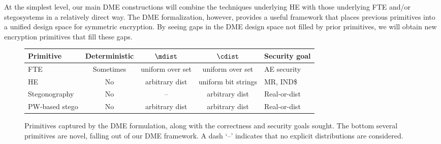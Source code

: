 At the simplest level, our main DME constructions will combine the techniques
underlying HE with those underlying FTE and/or stegosystems in a relatively
direct way.  The DME formalization, however, provides a useful framework that
places previous primitives into a unified design space for symmetric encryption.
By seeing gaps in the DME design space not filled by prior primitives, we will
obtain new encryption primitives that fill these gaps.







\begin{figure}[t]
\center
\begin{tabular}{|l|c|c|c|l|}
\hline
Primitive & Deterministic & $\mdist$ & $\cdist$ & Security goal\\
\hline
\hline
FTE~\cite{Bellare:2009,ccs12,usenix13} & Sometimes & uniform over set & uniform over set &  AE security\\
HE~\cite{juels2014} & No & arbitrary dist & uniform bit strings & MR, IND\$ \\
Stegonography~\cite{hopper} & No & -- & arbitrary dist & Real-or-dist \\
\hline
PW-based stego & No & arbitrary dist & arbitrary dist & Real-or-dist \\
\hline
\end{tabular}

\caption{Primitives captured by the DME formulation, along with the correctness
and security goals sought. The bottom several primitives are novel, falling out
of our DME framework. A dash `--' indicates that no explicit distributions 
are considered.}
\label{fig:primitive-summary}
\end{figure}

